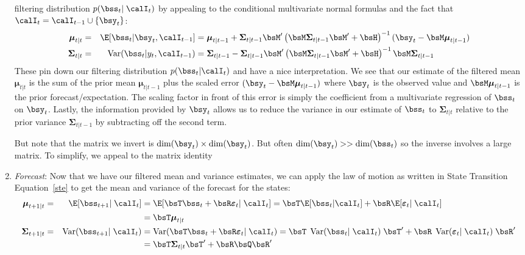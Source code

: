 \documentclass[12pt]{article}
\theoremstyle{plain}
\theoremstyle{definition}
\theoremstyle{remark}
\newcommand{\bsmu}{\boldsymbol{\mu}}
\newcommand{\bsSigma}{\boldsymbol{\Sigma}}
\newcommand{\bsvarepsilon}{\boldsymbol{\varepsilon}}
\newcommand{\Var}{\operatorname{Var}}
\begin{document}
\begin{enumerate}
    filtering distribution $p(\bss_t | \;\calI_{t})$ by appealing to the
    conditional multivariate normal formulas and the fact that
    $\calI_{t}=\calI_{t-1} \cup \{\bsy_t\}$:
    \begin{alignat}{3}
      \bsmu_{t|t} =&& \E[\bss_t|\bsy_t, \calI_{t-1}]
        &= \bsmu_{t|t-1} + \bsSigma_{t|t-1} \bsM'
        \left(\bsM\bsSigma_{t|t-1}\bsM' + \bsH\right)^{-1}
        (\bsy_t-\bsM\bsmu_{t|t-1}) \notag\\
      \bsSigma_{t|t} =&&
        \Var(\bss_t|y_t, \calI_{t-1})
        &= \bsSigma_{t|t-1} - \bsSigma_{t|t-1}\bsM'
        \left(\bsM\bsSigma_{t|t-1}\bsM' + \bsH\right)^{-1}
        \bsM\bsSigma_{t|t-1} \notag
    \end{alignat}
    These pin down our filtering distribution $p(\bss_t|\calI_t)$ and
    have a nice interpretation. We see that our estimate of the filtered
    mean $\bsmu_{t|t}$ is the sum of the prior mean $\bsmu_{t|t-1}$ plus
    the scaled error $(\bsy_t-\bsM\bsmu_{t|t-1})$ where $\bsy_t$ is the
    observed value and $\bsM\bsmu_{t|t-1}$ is the prior
    forecast/expectation.
    The scaling factor in front of this error is simply the coefficient
    from a multivariate regression of $\bss_t$ on $\bsy_t$.
    Lastly, the information provided by
    $\bsy_t$ allows us to reduce the variance in our estimate of
    $\bss_t$ to $\bsSigma_{t|t}$ relative to the prior variance
    $\bsSigma_{t|t-1}$ by subtracting off the second term.

    But note that the matrix we invert is
    $\dim(\bsy_t)\times\dim(\bsy_t)$.  But often
    $\dim(\bsy_t)>>\dim(\bss_t)$ so the inverse involves a large matrix.
    To simplify, we appeal to the matrix identity

  \item
    \emph{Forecast}: Now that we have our filtered mean and
    variance estimates, we can apply the law of motion as written in
    State Transition Equation~\ref{ste} to get the mean and variance of
    the forecast for the states:
    \begin{alignat*}{3}
      \bsmu_{t+1|t} =&& \E[\bss_{t+1}|\;\calI_{t}] &=
        \E[\bsT\bss_t + \bsR\bsvarepsilon_t |\;\calI_{t}] =
        \bsT\E[\bss_t | \calI_{t}]
        + \bsR\E[\bsvarepsilon_t |\;\calI_{t}]  \\
        && &= \bsT\bsmu_{t|t} \\
      \bsSigma_{t+1|t} = &&\Var(\bss_{t+1}|\;\calI_{t})
      &= \Var(\bsT\bss_t + \bsR\bsvarepsilon_t |\;\calI_{t})
      = \bsT\;\Var(\bss_t|\;\calI_{t})\;\bsT'
      + \bsR\;\Var(\bsvarepsilon_t|\;\calI_{t})\;\bsR' \\
      && &= \bsT\bsSigma_{t|t}\bsT' + \bsR\bsQ\bsR'
    \end{alignat*}


\end{enumerate}
\end{document}
